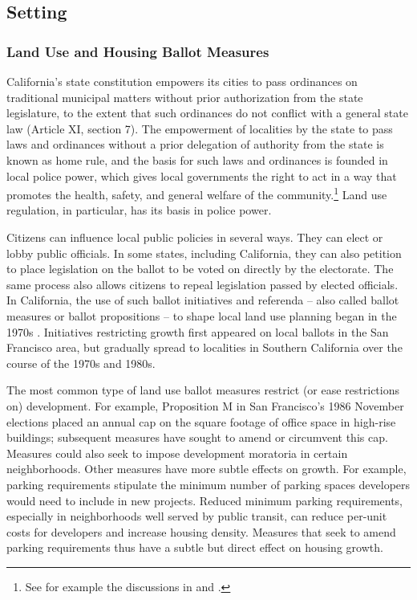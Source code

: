 \documentclass[article,12pt]{memoir}
\begin{document}
\subsection{Setting}

\subsubsection{Land Use and Housing Ballot Measures}

California's state constitution empowers its cities to pass ordinances on traditional municipal matters without prior authorization from the state legislature, to the extent that such ordinances do not conflict with a general state law (Article XI, section 7).  The empowerment of localities by the state to pass laws and ordinances without a prior delegation of authority from the state is known as home rule, and the basis for such laws and ordinances is founded in local police power, which gives local governments the right to act in a way that promotes the health, safety, and general welfare of the community.\footnote{See for example the discussions in \citet[pp.19ff]{fischel_homevoter_2001} and \citet[pp.70ff]{berman_local_2015}.}  Land use regulation, in particular, has its basis in police power.  

Citizens can influence local public policies in several ways.  They can elect or lobby public officials.  In some states, including California, they can also petition to place legislation on the ballot to be voted on directly by the electorate.  The same process also allows citizens to repeal legislation passed by elected officials.  In California, the use of such ballot initiatives and referenda -- also called ballot measures or ballot propositions -- to shape local land use planning began in the 1970s \citep[p. 244]{fulton_guide_2012}.  Initiatives restricting growth first appeared on local ballots in the San Francisco area, but gradually spread to localities in Southern California over the course of the 1970s and 1980s.

The most common type of land use ballot measures restrict (or ease restrictions on) development.  For example, Proposition M in San Francisco's 1986 November elections placed an annual cap on the square footage of office space in high-rise buildings; subsequent measures have sought to amend or circumvent this cap.  Measures could also seek to impose development moratoria in certain neighborhoods.  Other measures have more subtle effects on growth. For example, parking requirements stipulate the minimum number of parking spaces developers would need to include in new projects. Reduced minimum parking requirements, especially in neighborhoods well served by public transit, can reduce per-unit costs for developers and increase housing density. Measures that seek to amend parking requirements thus have a subtle but direct effect on housing growth.
\end{document}
